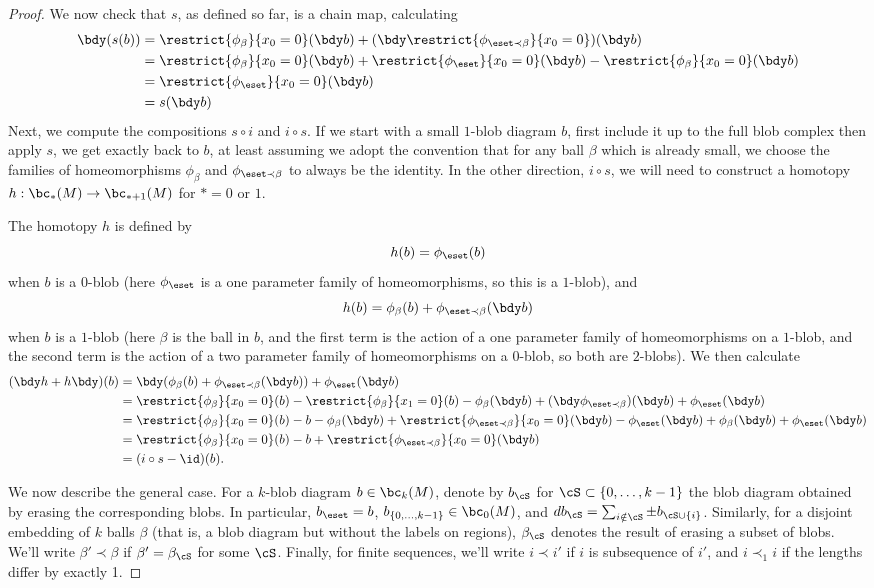 \begin{proof}
We now check that $s$, as defined so far, is a chain map, calculating
\begin{align*}
\bdy (s(b)) & = \restrict{\phi_\beta}{x_0=0}(\bdy b) + (\bdy \restrict{\phi_{\eset \prec \beta}}{x_0=0})(\bdy b) \\
		 & = \restrict{\phi_\beta}{x_0=0}(\bdy b) + \restrict{\phi_\eset}{x_0=0}(\bdy b) - \restrict{\phi_\beta}{x_0=0}(\bdy b) \\
		 & = \restrict{\phi_\eset}{x_0=0}(\bdy b) \\
		 & = s(\bdy b)
\end{align*}
Next, we compute the compositions $s \circ i$ and $i \circ s$. If we start with a small $1$-blob diagram $b$, first include it up to the full blob complex then apply $s$, we get exactly back to $b$, at least assuming we adopt the convention that for any ball $\beta$ which is already small, we choose the families of homeomorphisms $\phi_\beta$ and $\phi_{\eset \prec \beta}$ to always be the identity. In the other direction, $i \circ s$, we will need to construct a homotopy $h:\bc_*(M) \to \bc_{*+1}(M)$ for $*=0$ or $1$.

The homotopy $h$ is defined by $$h(b) = \phi_\eset(b)$$ when $b$ is a $0$-blob (here $\phi_\eset$ is a one parameter family of homeomorphisms, so this is a $1$-blob), and $$h(b) = \phi_\beta(b) + \phi_{\eset \prec \beta}(\bdy b)$$ when $b$ is a $1$-blob (here $\beta$ is the ball in $b$, and the first term is the action of a one parameter family of homeomorphisms on a $1$-blob, and the second term is the action of a two parameter family of homeomorphisms on a $0$-blob, so both are $2$-blobs). We then calculate
\begin{align*}
(\bdy h+h \bdy)(b) & = \bdy (\phi_{\beta}(b) + \phi_{\eset \prec \beta}(\bdy b)) + \phi_\eset(\bdy b)  \\
	& =  \restrict{\phi_\beta}{x_0=0}(b) - \restrict{\phi_\beta}{x_1=0}(b) - \phi_\beta(\bdy b) + (\bdy \phi_{\eset \prec \beta})(\bdy b) + \phi_\eset(\bdy b) \\
	& =  \restrict{\phi_\beta}{x_0=0}(b) - b - \phi_\beta(\bdy b) + \restrict{\phi_{\eset \prec \beta}}{x_0=0}(\bdy b) -  \phi_\eset(\bdy b) + \phi_\beta(\bdy b) + \phi_\eset(\bdy b) \\
	& = \restrict{\phi_\beta}{x_0=0}(b) - b + \restrict{\phi_{\eset \prec \beta}}{x_0=0}(\bdy b) \\
	& = (i \circ s - \id)(b).
\end{align*}

We now describe the general case. For a $k$-blob diagram $b \in \bc_k(M)$, denote by $b_\cS$ for $\cS \subset \{0, \ldots, k-1\}$ the blob diagram obtained by erasing the corresponding blobs. In particular, $b_\eset = b$, $b_{\{0,\ldots,k-1\}} \in \bc_0(M)$, and $d b_\cS = \sum_{i \notin \cS} \pm  b_{\cS \cup \{i\}}$.
Similarly, for a disjoint embedding of $k$ balls $\beta$ (that is, a blob diagram but without the labels on regions), $\beta_\cS$ denotes the result of erasing a subset of blobs. We'll write $\beta' \prec \beta$ if $\beta' = \beta_\cS$ for some $\cS$. Finally, for finite sequences, we'll write $i \prec i'$ if $i$ is subsequence of $i'$, and $i \prec_1 i$ if the lengths differ by exactly 1.


\end{proof}
